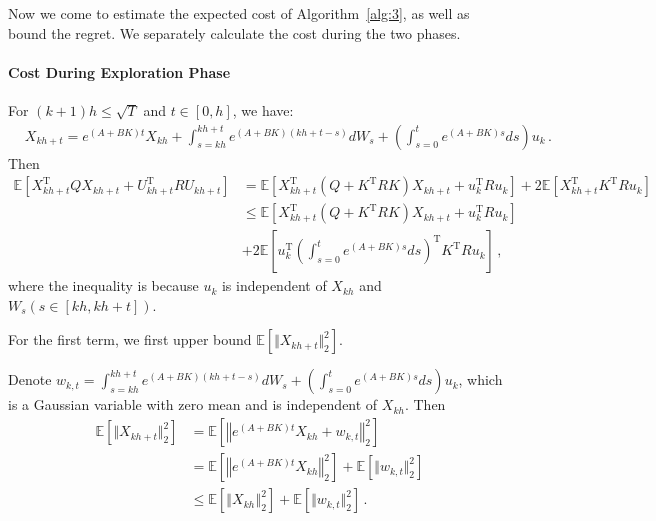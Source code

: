 \documentclass{article}
\theoremstyle{definition}
\begin{document}
Now we come to estimate the expected cost of Algorithm~\ref{alg:3}, as well as bound the regret. We separately calculate the cost during the two phases.

\paragraph{Cost During Exploration Phase} 
For $(k+1)h\leq \sqrt{T}$ and $t\in[0,h]$, we have:
\begin{align*}
&X_{kh+t}=e^{(A+BK)t}X_{kh}+\int_{s=kh}^{kh+t}e^{(A+BK)(kh+t-s)}dW_{s}+\left(\int_{s=0}^{t}e^{(A+BK)s}ds\right)u_{k}\,.
\end{align*}
Then
\begin{align*}
\mathbb{E}\left[X^{\mathrm{T}}_{kh+t}QX_{kh+t}+U^{\mathrm{T}}_{kh+t}RU_{kh+t}\right]
&=\mathbb{E}\left[X^{\mathrm{T}}_{kh+t}(Q+K^{\mathrm{T}}RK)X_{kh+t}+u^{\mathrm{T}}_{k}Ru_{k}\right]+2\mathbb{E}\left[X^{\mathrm{T}}_{kh+t}K^{\mathrm{T}}Ru_{k}\right]\\
&\leq \mathbb{E}\left[X^{\mathrm{T}}_{kh+t}(Q+K^{\mathrm{T}}RK)X_{kh+t}+u^{\mathrm{T}}_{k}Ru_{k}\right]\\
&+2\mathbb{E}\left[u^{\mathrm{T}}_{k}\left(\int_{s=0}^{t}e^{(A+BK)s}ds\right)^{\mathrm{T}}K^{\mathrm{T}}Ru_{k}   \right]\,,
\end{align*}
where the inequality is because $u_{k}$ is independent of $X_{kh}$ and $W_{s}(s\in[kh,kh+t])$.

For the first term, we first upper bound $\mathbb{E}\left[\Vert X_{kh+t}\Vert^{2}_{2} \right]$.

Denote $w_{k,t}=\int_{s=kh}^{kh+t}e^{(A+BK)(kh+t-s)}dW_{s}+\left(\int_{s=0}^{t}e^{(A+BK)s}ds\right)u_{k}$, which is a Gaussian variable with zero mean and is independent of $X_{kh}$. Then 
\begin{align*}
\mathbb{E}\left[\Vert X_{kh+t}\Vert^{2}_{2} \right]&=\mathbb{E}\left[\left\Vert e^{(A+BK)t}X_{kh}+w_{k,t}\right\Vert^{2}_{2} \right]\\
&=\mathbb{E}\left[\left\Vert e^{(A+BK)t} X_{kh}\right\Vert^{2}_{2} \right]+\mathbb{E}\left[\Vert w_{k,t}\Vert^{2}_{2} \right]\\
&\leq \mathbb{E}\left[\left\Vert X_{kh}\right\Vert^{2}_{2} \right]+\mathbb{E}\left[\Vert w_{k,t}\Vert^{2}_{2} \right]\,.
\end{align*}
\end{document}
